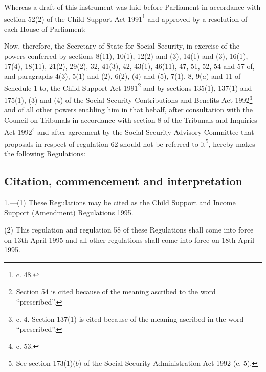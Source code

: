 \documentclass[12pt,a4paper]{article}
\title{\regstitle}
\author{S.I. 1995 No. 1045}
\date{Made 10th January 1995\\Coming into force\\Regulations 1 and 58 13th April 1995\\Remainder 18th April 1995}
\begin{document}
\maketitle

\noindent
Whereas a draft of this instrument was laid before Parliament in accordance with section 52(2) of the Child Support Act 1991\footnote{ c. 48.} and approved by a resolution of each House of Parliament:

 Now, therefore, the Secretary of State for Social Security, in exercise of the powers conferred by sections 8(11), 10(1), 12(2) and (3), 14(1) and (3), 16(1), 17(4), 18(11), 21(2), 29(2), 32, 41(3), 42, 43(1), 46(11), 47, 51, 52, 54 and 57 of, and paragraphs 4(3), 5(1) and (2), 6(2), (4) and (5), 7(1), 8, 9($a$) and 11 of Schedule 1 to, the Child Support Act 1991\footnote{\frenchspacing Section 54 is cited because of the meaning ascribed to the word “prescribed”.} and by sections 135(1), 137(1) and 175(1), (3) and (4) of the Social Security Contributions and Benefits Act 1992\footnote{ c. 4. Section 137(1) is cited because of the meaning ascribed in the word “prescribed”.} and of all other powers enabling him in that behalf, after consultation with the Council on Tribunals in accordance with section 8 of the Tribunals and Inquiries Act 1992\footnote{ c. 53.} and after agreement by the Social Security Advisory Committee that proposals in respect of regulation 62 should not be referred to it\footnote{\frenchspacing See section 173(1)($b$) of the Social Security Administration Act 1992 (c. 5).}, hereby makes the following Regulations:

{\sloppy

\tableofcontents

}

\setcounter{secnumdepth}{-2}

\subsection[1. Citation, commencement and interpretation]{Citation, commencement and interpretation}

1.—(1) These Regulations may be cited as the Child Support and Income Support (Amendment) Regulations 1995.

(2) This regulation and regulation 58 of these Regulations shall come into force on 13th April 1995 and all other regulations shall come into force on 18th April 1995.
\end{document}
